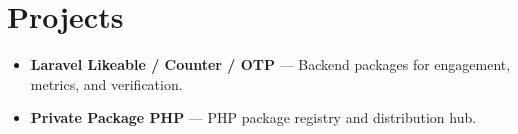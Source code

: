 \section*{Projects}
\begin{itemize}
  \item \textbf{Laravel Likeable / Counter / OTP} --- Backend packages for engagement, metrics, and verification.
  \item \textbf{Private Package PHP} --- PHP package registry and distribution hub.
\end{itemize}
